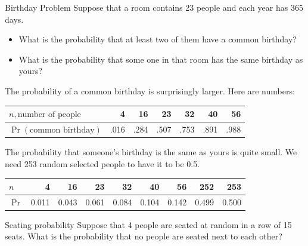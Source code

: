 \documentclass[serif,envcountsect,table,t%
]{beamer}%
\begin{document}
\begin{frame}{Birthday Problem}
Suppose that a room contains 23 people and each year has 365 days.
\begin{itemize}
\item What is the probability that at least two of them have a common birthday?
\item What is the probability that some one in that room has the same birthday
  as yours?
\end{itemize}
\pause \vspace{.21cm}
The probability of a common birthday is surprisingly larger. Here are numbers:\\
  \begin{center}
  \begin{tabular}{lrrrrrr}\hline
    $n, \text{number of people}$ & 4 & 16 & 23 & 32 & 40 & 56 \\
    \hline
    $\Pr(\text{common birthday})$ & .016 & .284 & .507 & .753 & .891 & .988
    \\\hline
  \end{tabular}
\end{center}
\pause
The probability that someone's birthday is the same as yours is quite small. We need 253 random selected people to have it to be 0.5.

  \begin{center}
  \begin{tabular}{lrrrrrrrr}\hline
    $n$ & 4 & 16 & 23 & 32 & 40 & 56 & 252 & 253\\
    \hline
    $\Pr$ & 0.011 & 0.043 & 0.061 & 0.084 & 0.104 & 0.142 & 0.499 & 0.500
    \\\hline
  \end{tabular}
\end{center}
\end{frame}
\begin{frame}{Seating probability}
  Suppose that 4 people are seated at random in a row of 15 seats. What is
  the probability that no people are seated next to each other?
\end{frame}
\end{document}
